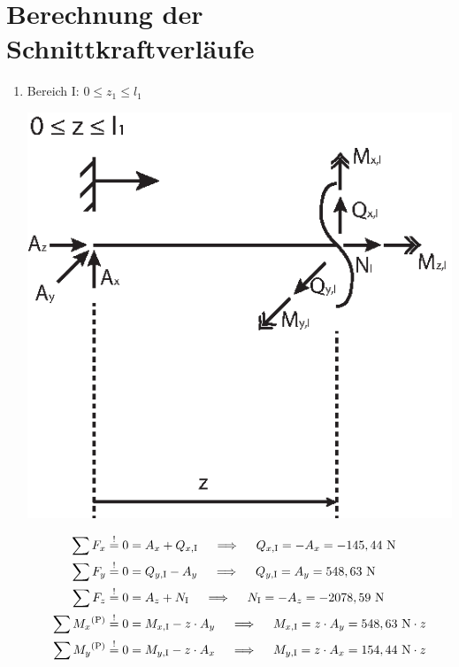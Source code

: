 \section{Berechnung der Schnittkraftverläufe}
\renewcommand{\labelenumi}{\roman{enumi})}
\begin{enumerate}
\item Bereich I: $0 \leq z_1 \leq l_1$
\begin{center}
	\includegraphics{figures/Bereich_1}
\end{center}
    \begin{align*}
        \sum F_x &\overset{!}{=} 0 = A_x + Q_{x,\mathrm{I}} \quad \implies \quad  Q_{x,\mathrm{I}} = -A_x = -145,44\text{ N}\\ 
        \sum F_y &\overset{!}{=} 0 =  Q_{y,\mathrm{I}} - A_y \quad \implies \quad  Q_{y,\mathrm{I}} = A_y = 548,63\text{ N}\\
        \sum F_z &\overset{!}{=} 0 = A_z + N_{\mathrm{I}} \quad \implies \quad  N_{\mathrm{I}} = -A_z = -2078,59\text{ N}\\
        \sum M_x \textsuperscript{(P)}&\overset{!}{=} 0 = M_{x,\mathrm{I}} - z \x A_y \quad \implies \quad   M_{x,\mathrm{I}} = z \x A_y = 548,63 \text{ N} \x z\\ 
        \sum M_y \textsuperscript{(P)}&\overset{!}{=} 0 = M_{y,\mathrm{I}} - z \x A_x \quad \implies \quad   M_{y,\mathrm{I}} = z \x A_x =154,44 \text{ N} \x z\\ 

\end{align*}
\end{enumerate}
